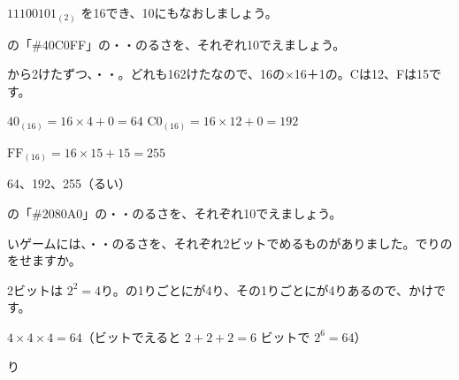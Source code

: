 \begin{jibun}
$11100101_{(2)}$ を16でき、10にもなおしましょう。
\end{jibun}

\begin{reidai}[\R{色}{いろ}の\R{番号}{ばん|ごう}を\R{読}{よ}む]
の「\#40C0FF」の・・のるさを、それぞれ10でえましょう。\par
\kangaekata {}から2けたずつ、・・。どれも162けたなので、16の×16＋1の。Cは12、Fは15です。\par
\shiki {} $40_{(16)}=16\times4+0=64$\quad {} $\mathrm{C0}_{(16)}=16\times12+0=192$\par
\hspace*{2.6\zw} $\mathrm{FF}_{(16)}=16\times15+15=255$\par
\kotae {}64、192、255（るい）
\end{reidai}

\begin{jibun}
の「\#2080A0」の・・のるさを、それぞれ10でえましょう。
\end{jibun}

\begin{reidai}[\R{組}{く}み\R{合}{あ}わせの\R{数}{かず}]
いゲームには、・・のるさを、それぞれ2ビットでめるものがありました。でりのをせますか。\par
\kangaekata 2ビットは $2^2=4$り。の1りごとにが4り、その1りごとにが4りあるので、かけです。\par
\shiki $4\times4\times4=64$\quad（ビットでえると $2+2+2=6$ ビットで $2^6=64$）\par
{}り
\end{reidai}

